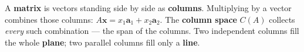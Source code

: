 \documentclass[10pt]{article}
\begin{document}
\vspace{0.10in}

\begin{remindbox}
\small A \textbf{matrix} is vectors standing side by side as \textbf{columns}. Multiplying by a
vector combines those columns: $A\mathbf{x}=x_1\mathbf{a}_1+x_2\mathbf{a}_2$. The
\textbf{column space} $C(A)$ collects \emph{every} such combination --- the span of the columns.
Two independent columns fill the whole \textbf{plane}; two parallel columns fill only a
\textbf{line}.
\end{remindbox}
\end{document}
